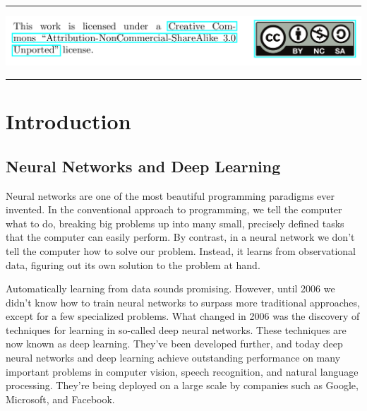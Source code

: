 \documentclass[a4paper,12pt]{report}%
\begin{document}
\vspace*{3cm}


\hrule

\includegraphics[width=\linewidth]{./images/ccl.png}

\hrule
\setcounter{page}{5}
\tableofcontents{}

\newpage

\setcounter{page}{8}


%
%
%
%

\chapter{\color{IAF} \bf Introduction}
\section{Neural Networks and Deep Learning}
Neural networks are one of the most beautiful programming paradigms ever invented. In the conventional approach to programming, we tell the computer what to do, breaking big problems up into many small, precisely defined tasks that the computer can easily perform. By contrast, in a neural network we don't tell the computer how to solve our problem. Instead, it learns from observational data, figuring out its own solution to the problem at hand.

Automatically learning from data sounds promising. However, until 2006 we didn't know how to train neural networks to surpass more traditional approaches, except for a few specialized problems. What changed in 2006 was the discovery of techniques for learning in so-called deep neural networks. These techniques are now known as deep learning. They've been developed further, and today deep neural networks and deep learning achieve outstanding performance on many important problems in computer vision, speech recognition, and natural language processing. They're being deployed on a large scale by companies such as Google, Microsoft, and Facebook.
\end{document}
